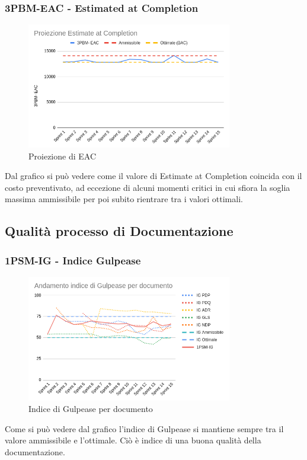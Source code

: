 \documentclass{article}
\begin{document}
        \subsubsection{3PBM-EAC - Estimated at Completion}
        \begin{figure}[H]
            \centering
            \includegraphics[width=0.8\textwidth]{../../img/pdq_charts/chart4-proiezioneEAC.png}
            \caption{Proiezione di EAC}
        \end{figure}
        Dal grafico si può vedere come il valore di Estimate at Completion coincida con il costo preventivato, ad eccezione di alcuni momenti critici in cui sfiora la soglia massima ammissibile per poi subito rientrare tra i valori ottimali.


    \subsection{Qualità processo di Documentazione}
        \subsubsection{1PSM-IG - Indice Gulpease}
        \begin{figure}[H]
            \centering
            \includegraphics[width=0.8\textwidth]{../../img/pdq_charts/chart5-indiceGulpease.png}
            \caption{Indice di Gulpease per documento}
        \end{figure}
        Come si può vedere dal grafico l'indice di Gulpease si mantiene sempre tra il valore ammissibile e l'ottimale. Ciò è indice di una buona qualità della documentazione.
\end{document}
